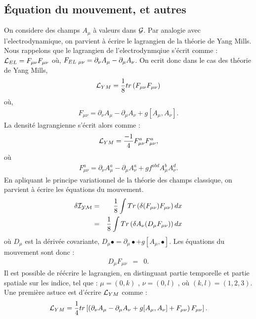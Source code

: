 \documentclass[a4paper,11pt]{article} %
\theoremstyle{plain}
\theoremstyle{definition}
\theoremstyle{remark}
\numberwithin{equation}{section}
\numberwithin{equation}{subsection}
\numberwithin{figure}{section}
\begin{document}
  \subsection{Équation du mouvement, et autres}

\noindent
On considere des champs $A_{\mu}$ à valeurs dans $\cal{G}$. Par analogie avec l'electrodynamique, on parvient à écrire le lagrangien de la théorie de Yang Mills. Nous rappelons que le lagrangien de l'electrodynmqiue s'écrit comme : $\mathcal{L}_{\small EL} = F_{\mu\nu}F_{\mu \nu}$ où, $F_{EL \hspace{1mm} \mu \nu}= \partial_{\nu}A_{\mu} - \partial_{\mu}A_{\nu}$. On ecrit donc dans le cas des théorie de Yang Mills,
\begin{eqnarray*}
\mathcal{L}_{\small YM} = \frac{1}{8} tr\left(F_{\mu\nu}F_{\mu \nu}\right)
\end{eqnarray*}
où,
\begin{eqnarray*}
F_{\mu \nu}=\partial_{\nu}A_{\mu} - \partial_{\mu}A_{\nu} + g[A_{\mu},A_{\nu}].
\end{eqnarray*}
La densité lagrangienne s'écrit alors comme :
\begin{eqnarray*}
\mathcal{L}_{\small YM} = \frac{-1}{4} F^{a}_{\mu\nu}F^{a}_{\mu \nu},
\end{eqnarray*}
où
\begin{eqnarray*}
F^{a}_{\mu \nu}=\partial_{\nu}A^{a}_{\mu} - \partial_{\mu}A^{a}_{\nu} + gf^{abd}A^{b}_{\mu}A^{d}_{\nu}.
\end{eqnarray*}
En apliquant le principe variationnel de la théorie des champs classique, on parvient à écrire les équations du mouvement.
\begin{eqnarray*}
 \delta \cal{I}_{YM}  &=&  \frac{1}{8}  \int  Tr\left(\delta ( F_{\mu \nu} ) F_{\mu \nu} \right) dx \\
                                    &=&  \frac{1}{8}  \int  Tr\left(\delta A_{\nu} ( D_{\mu} F_{\mu \nu} )  \right) dx
\end{eqnarray*}
où $D_{\mu}$ est la dérivée covariante, $D_{\mu} \bullet  =  \partial_{\mu} \bullet  + g [ A_{\mu} , \bullet ] $. Les équations du mouvement sont donc :
\begin{eqnarray*}
D_{\mu} F_{\mu \nu} &=&  0.
\end{eqnarray*}
Il est possible de réécrire le lagrangien, en distinguant partie temporelle et partie spatiale sur les indice, tel que : $\mu = (0,k)$ , $\nu = (0,l)$ , où $(k,l) = (1, 2, 3)$. Une première astuce est d'écrire $\mathcal{L}_{\small YM}$ comme :
\begin{eqnarray*}
 \mathcal{L}_{\small YM} = \frac{1}{4} tr\left[ \left( \partial_{\nu}A_{\mu} - \partial_{\mu}A_{\nu} + g[A_{\mu},A_{\nu}] 
+ F_{\mu\nu} \right)F_{\mu \nu}\right].
\end{eqnarray*}
\end{document}
